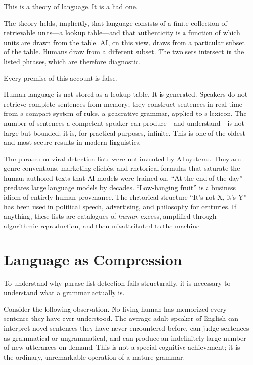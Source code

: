 \documentclass[12pt]{article}
\begin{document}
This is a theory of language. It is a bad one.

The theory holds, implicitly, that language consists of a finite collection of retrievable units---a lookup table---and that authenticity is a function of which units are drawn from the table. AI, on this view, draws from a particular subset of the table. Humans draw from a different subset. The two sets intersect in the listed phrases, which are therefore diagnostic.

Every premise of this account is false.

Human language is not stored as a lookup table. It is generated. Speakers do not retrieve complete sentences from memory; they construct sentences in real time from a compact system of rules, a generative grammar, applied to a lexicon. The number of sentences a competent speaker can produce---and understand---is not large but bounded; it is, for practical purposes, infinite. This is one of the oldest and most secure results in modern linguistics.

The phrases on viral detection lists were not invented by AI systems. They are genre conventions, marketing clich\'es, and rhetorical formulas that saturate the human-authored texts that AI models were trained on. ``At the end of the day'' predates large language models by decades. ``Low-hanging fruit'' is a business idiom of entirely human provenance. The rhetorical structure ``It's not X, it's Y'' has been used in political speech, advertising, and philosophy for centuries. If anything, these lists are catalogues of \emph{human} excess, amplified through algorithmic reproduction, and then misattributed to the machine.

\section{Language as Compression}

To understand why phrase-list detection fails structurally, it is necessary to understand what a grammar actually is.

Consider the following observation. No living human has memorized every sentence they have ever understood. The average adult speaker of English can interpret novel sentences they have never encountered before, can judge sentences as grammatical or ungrammatical, and can produce an indefinitely large number of new utterances on demand. This is not a special cognitive achievement; it is the ordinary, unremarkable operation of a mature grammar.
\end{document}

